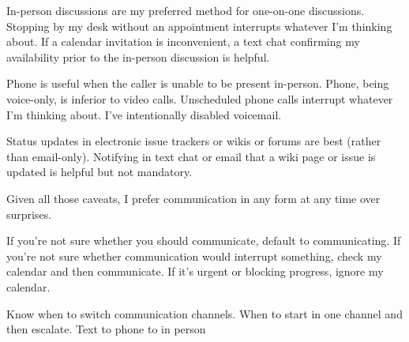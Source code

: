 In-person discussions are my preferred method for one-on-one discussions. Stopping by my desk  without an appointment interrupts whatever I'm thinking about. If a calendar invitation is inconvenient, a text chat confirming my availability prior to the in-person discussion is helpful. 

Phone is useful when the caller is unable to be present in-person. Phone, being voice-only, is inferior to video calls. Unscheduled phone calls interrupt whatever I'm thinking about. I've intentionally disabled voicemail. 

Status updates in electronic issue trackers or wikis or forums are best (rather than email-only). Notifying in text chat or email that a wiki page or issue is updated is helpful but not mandatory. 

Given all those caveats, I prefer communication in any form at any time over surprises. 

If you're not sure whether you should communicate, default to communicating. If you're not sure whether communication would interrupt something, check my calendar and then communicate. If it's urgent or blocking progress, ignore my calendar. 

Know when to switch communication channels. When to start in one channel and then escalate. Text to phone to in person 
